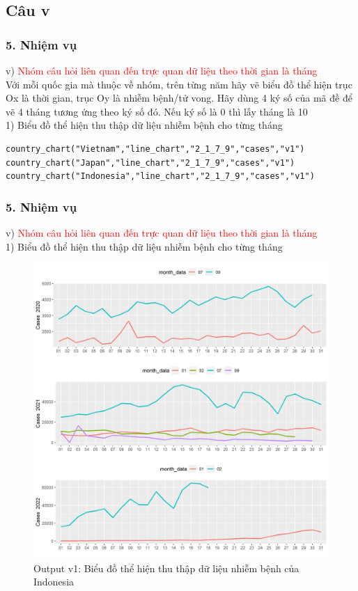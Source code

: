 \documentclass[english,10pt,table]{beamer}
\begin{document}
\subsection{Câu v}
\begin{frame}[fragile]
\frametitle{5.  Nhiệm vụ}
v) \textcolor{red}{Nhóm câu hỏi liên quan đến trực quan dữ liệu theo thời gian là tháng}\\
Với mỗi quốc gia mà thuộc về nhóm, trên từng năm hãy vẽ biểu đồ thể hiện trục Ox là thời gian, trục Oy là nhiễm bệnh/tử vong. Hãy dùng 4 ký số của mã đề để vẽ 4 tháng tương ứng theo ký số đó. Nếu ký số là 0 thì lấy tháng là 10\\
    1) Biểu đồ thể hiện thu thập dữ liệu nhiễm bệnh cho từng tháng
    	\begin{lstlisting}[frame=single,basicstyle=\tiny]  
country_chart("Vietnam","line_chart","2_1_7_9","cases","v1")
country_chart("Japan","line_chart","2_1_7_9","cases","v1")
country_chart("Indonesia","line_chart","2_1_7_9","cases","v1")
		\end{lstlisting}
\end{frame}

\begin{frame}[fragile]
\frametitle{5.  Nhiệm vụ}
v) \textcolor{red}{Nhóm câu hỏi liên quan đến trực quan dữ liệu theo thời gian là tháng}\\
    1) Biểu đồ thể hiện thu thập dữ liệu nhiễm bệnh cho từng tháng
	\begin{figure}[h!]
	\begin{center}
		    \includegraphics[scale = 0.28]{Images/V/v1 Indonesia .jpeg}
		     \caption{Output v1: Biểu đồ thể hiện thu thập dữ liệu nhiễm bệnh của Indonesia}
		\end{center}
		\end{figure}
\end{frame}
\end{document}
